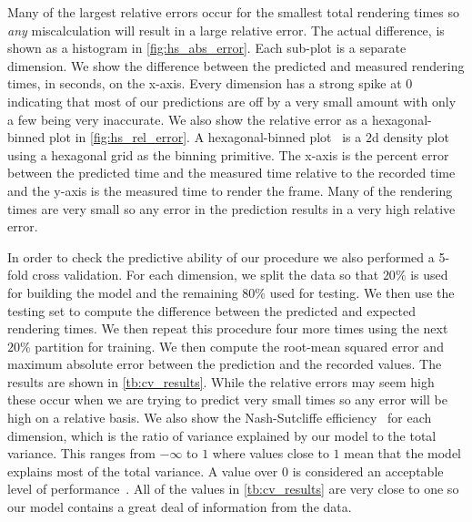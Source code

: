 Many of the largest relative errors occur for the smallest total rendering
times so \emph{any} miscalculation will result in a large relative error.  The
actual difference, is shown as a histogram in \autoref{fig:hs_abs_error}.  Each
sub-plot is a separate dimension.  We show the difference between the
predicted and measured rendering times, in seconds, on the x-axis.  Every
dimension has a strong spike at $0$ indicating that most of our predictions
are off by a very small amount with only a few being very inaccurate.  We also
show the relative error as a hexagonal-binned plot in \autoref{fig:hs_rel_error}.
A hexagonal-binned plot~\cite{Carr:1987} is a $2$d density plot using a
hexagonal grid as the binning primitive.  The x-axis is the percent error
between the predicted time and the measured time relative to the recorded time
and the y-axis is the measured time to render the frame.  Many of the
rendering times are very small so any error in the prediction results in a
very high relative error.

In order to check the predictive ability of our procedure we also performed a 
5-fold cross validation.  For each dimension, we split the data so that
$20\%$ is used for building the model and the remaining $80\%$ used for 
testing.  We then use the testing set to compute the difference between the 
predicted and expected rendering times.  We then repeat this procedure four
more times using the next $20\%$ partition for training.  We then compute
the root-mean squared error and maximum absolute
error between the prediction and the recorded values.  The results are 
shown in \autoref{tb:cv_results}.  While the relative errors may
seem high these occur when we are trying to predict very small
times so any error will be high on a relative basis.
We also show the
Nash-Sutcliffe efficiency~\cite{Nash:1970} for each dimension, which is the 
ratio of variance explained by our model to the total variance.  This ranges
from $-\infty$ to $1$ where values close to $1$ mean that the model explains 
most of the total variance.  A value over $0$ is considered an acceptable
level of performance~\cite{Moriasi:2007}.
All of the values in \autoref{tb:cv_results} are 
very close to one so our model contains a great deal of information from
the data.

\begin{table}[htb]
\centering
  \caption[Results of the cross-validation procedure.]{%
  Results of the cross-validation procedure.  For each dimension we compute
  the root-mean squared error of prediction as well as the Nash-Sutcliffe
  efficiency~\cite{Nash:1970}, and the relative maximum error.  The 
  Nash-Sutcliffe
  efficiency is the ratio of the variance explained by our prediction
  model to the total variance.
  All errors are in terms of seconds.
  }

\label{tb:cv_results}
\end{table}


